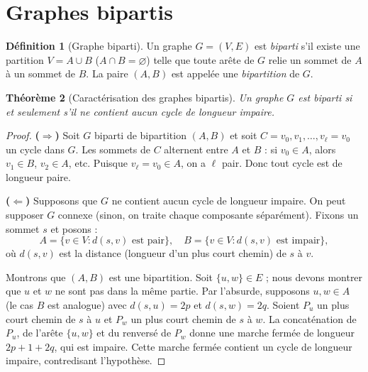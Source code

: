 \documentclass[12pt,a4paper,openany]{book}
\theoremstyle{definition}
\newtheorem{definition}{Définition}[chapter]
\theoremstyle{plain}
\newtheorem{theoreme}[definition]{Théorème}
\theoremstyle{remark}
\begin{document}
\section{Graphes bipartis}
\label{sec:graphes-bipartis}

\begin{definition}[Graphe biparti]
\label{def:biparti}
Un graphe $G=(V,E)$ est \emph{biparti} s'il existe une partition
$V = A \cup B$ ($A \cap B = \varnothing$) telle que toute arête de $G$
relie un sommet de $A$ à un sommet de $B$. La paire $(A,B)$ est appelée
une \emph{bipartition} de $G$.
\end{definition}

\begin{theoreme}[Caractérisation des graphes bipartis]
\label{thm:biparti-caract}
Un graphe $G$ est biparti si et seulement s'il ne contient aucun cycle de
longueur impaire.
\end{theoreme}

\begin{proof}
\textbf{($\Rightarrow$)}\;
Soit $G$ biparti de bipartition $(A,B)$ et soit
$C = v_0, v_1, \dots, v_\ell = v_0$ un cycle dans $G$. Les sommets de $C$
alternent entre $A$ et $B$ : si $v_0 \in A$, alors $v_1 \in B$,
$v_2 \in A$, etc. Puisque $v_\ell = v_0 \in A$, on a $\ell$ pair. Donc
tout cycle est de longueur paire.

\medskip\noindent
\textbf{($\Leftarrow$)}\;
Supposons que $G$ ne contient aucun cycle de longueur impaire. On peut
supposer $G$ connexe (sinon, on traite chaque composante séparément).
Fixons un sommet $s$ et posons :
\[
  A = \{v \in V : d(s,v) \text{ est pair}\}, \quad
  B = \{v \in V : d(s,v) \text{ est impair}\},
\]
où $d(s,v)$ est la distance (longueur d'un plus court chemin) de $s$ à $v$.

Montrons que $(A,B)$ est une bipartition. Soit $\{u,w\} \in E$ ; nous
devons montrer que $u$ et $w$ ne sont pas dans la même partie. Par
l'absurde, supposons $u, w \in A$ (le cas $B$ est analogue) avec
$d(s,u) = 2p$ et $d(s,w) = 2q$. Soient $P_u$ un plus court chemin de
$s$ à $u$ et $P_w$ un plus court chemin de $s$ à $w$. La concaténation de
$P_u$, de l'arête $\{u,w\}$ et du renversé de $P_w$ donne une marche
fermée de longueur $2p + 1 + 2q$, qui est impaire. Cette marche fermée
contient un cycle de longueur impaire, contredisant l'hypothèse.
\end{proof}
\end{document}
